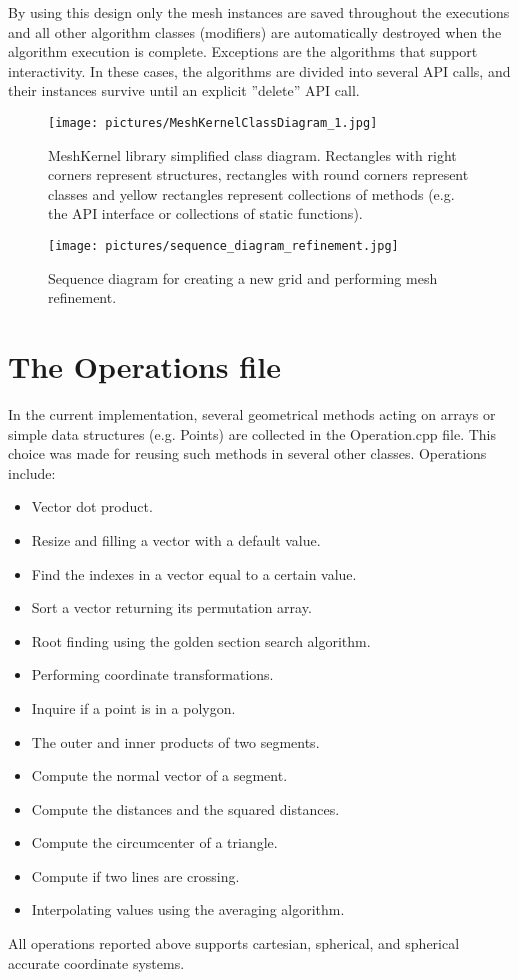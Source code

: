 \documentclass[biblatex]{deltares_manual}
\begin{document}
By using this design only the mesh instances are saved throughout the executions and all other algorithm classes (modifiers) are automatically destroyed when the algorithm execution is complete. Exceptions are the algorithms that support interactivity. In these cases, the algorithms are divided into several API calls, and their instances survive until an explicit ''delete'' API call.

\begin{figure}[H]
	\centering
	\texttt{[image: pictures/MeshKernelClassDiagram\_1.jpg]}
	\caption{MeshKernel library simplified class diagram. Rectangles with right corners represent structures, rectangles with round corners represent classes and yellow rectangles represent collections of methods (e.g. the API interface or collections of static functions).}
	\label{fig:classDiagram}
\end{figure}
\begin{figure}[H]
	\centering
	\texttt{[image: pictures/sequence\_diagram\_refinement.jpg]}
	\caption{Sequence diagram for creating a new grid and performing mesh refinement.}
	\label{fig:sequenceDiagram}
\end{figure}

\chapter{The Operations file}

In the current implementation, several geometrical methods acting on arrays or simple data structures (e.g. Points) are collected in the Operation.cpp file. This choice was made for reusing such methods in several other classes. Operations include:
\begin{itemize}
\item Vector dot product.
\item Resize and filling a vector with a default value.
\item Find the indexes in a vector equal to a certain value.
\item Sort a vector returning its permutation array.
\item Root finding using the golden section search algorithm.
\item Performing coordinate transformations.
\item Inquire if a point is in a polygon.
\item The outer and inner products of two segments.
\item Compute the normal vector of a segment.
\item Compute the distances and the squared distances.
\item Compute the circumcenter of a triangle.
\item Compute if two lines are crossing.
\item Interpolating values using the averaging algorithm.
\end{itemize}
All operations reported above supports cartesian, spherical, and spherical accurate coordinate systems.
\end{document}
